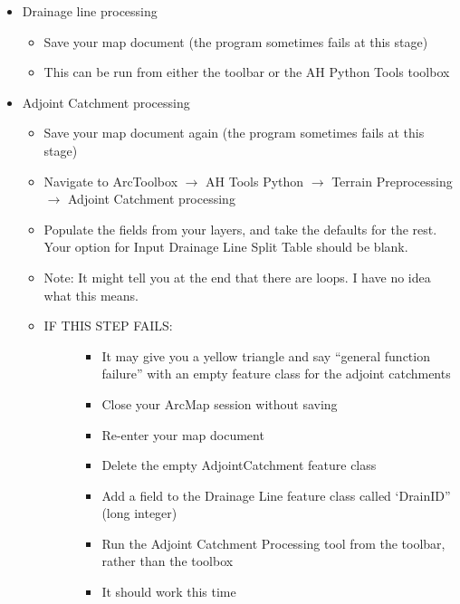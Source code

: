 \documentclass[letterpaper,10pt,english]{sphinxmanual}
\begin{document}
\begin{itemize}
\item {} 
Drainage line processing
\begin{itemize}
\item {} 
Save your map document (the program sometimes fails at this stage)

\item {} 
This can be run from either the toolbar or the AH Python Tools toolbox

\end{itemize}

\item {} 
Adjoint Catchment processing
\begin{itemize}
\item {} 
Save your map document again (the program sometimes fails at this stage)

\item {} 
Navigate to ArcToolbox \(\rightarrow\) AH Tools Python \(\rightarrow\) Terrain Preprocessing \(\rightarrow\) Adjoint Catchment processing

\item {} 
Populate the fields from your layers, and take the defaults for the rest. Your option for Input Drainage Line Split Table should be blank.

\item {} 
Note: It might tell you at the end that there are loops. I have no idea what this means.

\item {} \begin{description}
\item[{IF THIS STEP FAILS:}] \leavevmode\begin{itemize}
\item {} 
It may give you a yellow triangle and say “general function failure” with an empty feature class for the adjoint catchments

\item {} 
Close your ArcMap session without saving

\item {} 
Re-enter your map document

\item {} 
Delete the empty AdjointCatchment feature class

\item {} 
Add a field to the Drainage Line feature class called ‘DrainID” (long integer)

\item {} 
Run the Adjoint Catchment Processing tool from the toolbar, rather than the toolbox

\item {} 
It should work this time

\end{itemize}

\end{description}

\end{itemize}

\end{itemize}
\end{document}
